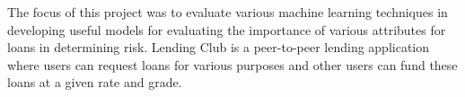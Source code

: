 The focus of this project was to evaluate various machine learning techniques in developing useful models for evaluating the importance of various attributes for loans in determining risk. 
Lending Club is a peer-to-peer lending application where users can request loans for various purposes and other users can fund these loans at a given rate and grade. 